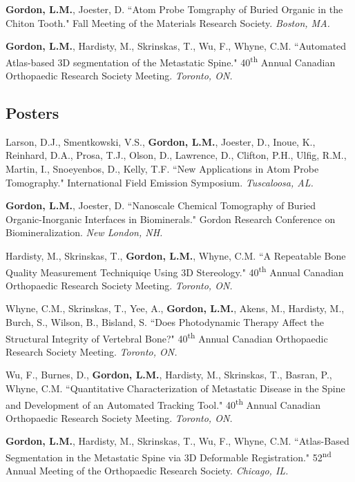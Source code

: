 \textbf{Gordon, L.M.}, Joester, D. ``Atom Probe Tomgraphy of Buried Organic in the Chiton Tooth." Fall Meeting of the Materials Research Society. \emph{Boston, MA.}

\textbf{Gordon, L.M.}, Hardisty, M., Skrinskas, T., Wu, F., Whyne, C.M. ``Automated Atlas-based 3D segmentation of the Metastatic Spine." 40\textsuperscript{th} Annual Canadian Orthopaedic Research Society Meeting. \emph{Toronto, ON.}
\endgroup

\subsection*{Posters}
Larson, D.J., Smentkowski, V.S., \textbf{Gordon, L.M.}, Joester, D., Inoue, K.,  Reinhard, D.A., Prosa, T.J., Olson, D., Lawrence, D., Clifton, P.H., Ulfig, R.M., Martin, I., Snoeyenbos, D.,  Kelly, T.F. ``New Applications in Atom Probe Tomography." International Field Emission Symposium. \emph{Tuscaloosa, AL.}

\begingroup\setlength{\parskip}{0.15cm}
\textbf{Gordon, L.M.}, Joester, D. ``Nanoscale Chemical Tomography of Buried Organic-Inorganic Interfaces in Biominerals." Gordon Research Conference on Biomineralization. \emph{New London, NH.}

Hardisty, M., Skrinskas, T., \textbf{Gordon, L.M.}, Whyne, C.M. ``A Repeatable Bone Quality Measurement Techniquiqe Using 3D Stereology." 40\textsuperscript{th} Annual Canadian Orthopaedic Research Society Meeting. \emph{Toronto, ON.}

Whyne, C.M., Skrinskas, T., Yee, A., \textbf{Gordon, L.M.}, Akens, M., Hardisty, M., Burch, S., Wilson, B., Bisland, S. ``Does Photodynamic Therapy Affect the Structural Integrity of Vertebral Bone?" 40\textsuperscript{th} Annual Canadian Orthopaedic Research Society  Meeting. \emph{Toronto, ON.}

Wu, F., Burnes, D., \textbf{Gordon, L.M.}, Hardisty, M., Skrinskas, T., Basran, P., Whyne, C.M. ``Quantitative Characterization of Metastatic Disease in the Spine and Development of an Automated Tracking Tool." 40\textsuperscript{th} Annual Canadian Orthopaedic Research Society Meeting. \emph{Toronto, ON.}

\textbf{Gordon, L.M.}, Hardisty, M., Skrinskas, T., Wu, F., Whyne, C.M. ``Atlas-Based Segmentation in the Metastatic Spine via 3D Deformable Registration." 52\textsuperscript{nd} Annual Meeting of the Orthopaedic Research Society. \emph{Chicago, IL.}

